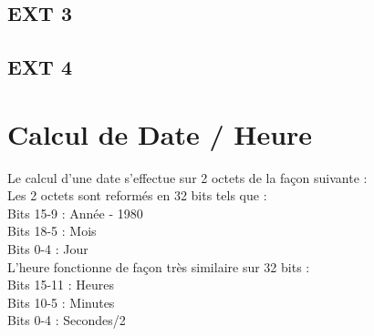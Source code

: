 \documentclass[11pt]{report}
\begin{document}
\section{EXT 3}

\section{EXT 4}

\appendix
\chapter{Calcul de Date / Heure}
Le calcul d'une date s'effectue sur 2 octets de la façon suivante : \\
Les 2 octets sont reformés en 32 bits tels que : \\
Bits 15-9 : Année - 1980 \\
Bits 18-5 : Mois \\
Bits 0-4 : Jour \\
L'heure fonctionne de façon très similaire sur 32 bits : \\
Bits 15-11 : Heures \\
Bits 10-5 : Minutes \\
Bits 0-4 : Secondes/2 \\
\end{document}
